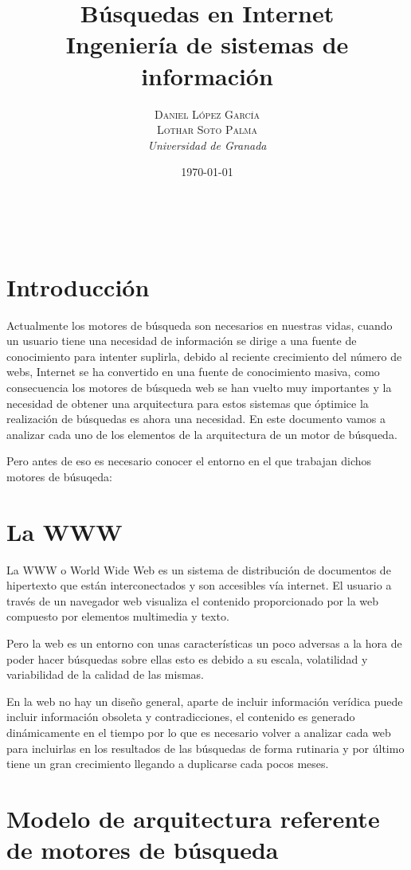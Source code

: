 \documentclass[a4paper, 11pt]{article} %
\title{\textbf{Búsquedas en Internet}\\ %
\vspace{20 pt}
Ingeniería de sistemas de información} %
\author{\textsc{Daniel López García\\
Lothar Soto Palma} %
\\{\textit{Universidad de Granada}}} %
\date{\today} %
\makeatletter
\renewcommand{\maketitle}{ %
\begin{center} %
{\Huge\@title} %
\end{center}

\vspace{20pt} %

\begin{flushright} %
{\large\@author} %
\\\@date %

\vspace{40pt} %
\end{flushright}
\renewcommand{\baselinestretch}{0.5}

}
\makeatother
\begin{document}
	\maketitle
	\tableofcontents
	\listoffigures
	\newpage

	\section{Introducción}
	Actualmente los motores de búsqueda son necesarios en nuestras vidas, cuando un usuario tiene una necesidad de información se dirige a una fuente de conocimiento para intenter suplirla, debido al reciente crecimiento del número de webs, Internet se ha convertido en una fuente de conocimiento masiva, como consecuencia los motores de búsqueda web se han vuelto muy importantes y la necesidad de obtener una arquitectura para estos sistemas que óptimice la realización de búsquedas es ahora una necesidad. En este documento vamos a analizar cada uno de los elementos de la arquitectura de un motor de búsqueda.

	Pero antes de eso es necesario conocer el entorno en el que trabajan dichos motores de búsuqeda:
	\section{La WWW}
	La WWW o World Wide Web es un sistema de distribución de documentos de hipertexto que están interconectados y son accesibles vía internet. El usuario a través de un navegador web visualiza el contenido proporcionado por la web compuesto por elementos multimedia y texto.

	Pero la web es un entorno con unas características un poco adversas a la hora de poder hacer búsquedas sobre ellas esto es debido a su escala, volatilidad y variabilidad de la calidad de las mismas.

	En la web no hay un diseño general, aparte de incluir información verídica puede incluir información obsoleta y contradicciones, el contenido es generado dinámicamente en el tiempo por lo que es necesario volver a analizar cada web para incluirlas en los resultados de las búsquedas de forma rutinaria y por último tiene un gran crecimiento llegando a duplicarse cada pocos meses.

	\section{Modelo de arquitectura referente de motores de búsqueda}
\end{document}
